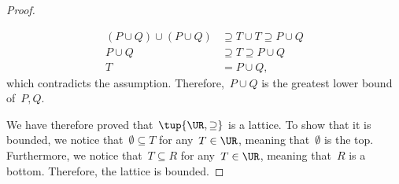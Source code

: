 \begin{proof}
\begin{itemize}
\begin{equation}
\begin{aligned}
      (P\cup Q)
        \cup (P\cup Q) &\supseteq T \cup T \supseteq P\cup Q\\
        P\cup Q &\supseteq T\supseteq P\cup Q\\
        T&=P\cup Q,
      \end{aligned}
    \end{equation}
    which contradicts the assumption. Therefore,~$P\cup Q$ is the greatest lower bound of~$P,Q$.
  \end{itemize}
  We have therefore proved that~$\tup{\UR,\supseteq}$ is a lattice. To show that it is bounded, we notice that~$\emptyset \subseteq T$ for any~$T\in \UR$, meaning that~$\emptyset$ is the top. Furthermore, we notice that~$T\subseteq R$ for any~$T\in \UR$, meaning that~$R$ is a bottom. Therefore, the lattice is bounded.
\end{proof}


